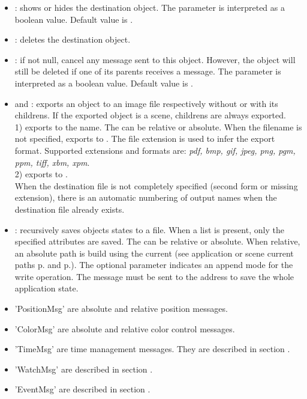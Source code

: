 \documentclass[a4paper,twoside]{report}
\begin{document}
\begin{itemize}
\item {}: shows or hides the destination object. The parameter is interpreted as a boolean value. Default value is . 
\item {}: deletes the destination object. 
\item {}: if not null, cancel any  message sent to this object. However, the object will still be deleted if one of its parents receives a  message. The parameter is interpreted as a boolean value. Default value is . 
\item {} and : exports an object to an image file respectively without or with its childrens. If the exported object is a scene, childrens are always exported.\\
1) exports to the  name. The  can be relative or absolute. When the filename is not specified, exports to . The file extension is used to infer the export format. Supported extensions and formats are: \emph{pdf, bmp, gif, jpeg, png, pgm, ppm, tiff, xbm, xpm}. \\
2) exports to .\\
When the destination file is not completely specified (second form or missing extension), there is an automatic numbering of output names when the destination file already exists.
\item {}: recursively saves objects states to a file. When a  list is present, only the specified attributes are saved. The  can be relative or absolute. When relative, an absolute path is build using the current  (see application or scene current paths  p.\pageref{applmgmt} and  p.\pageref{scene}). The optional \OSC{+} parameter indicates an append mode for the write operation. The message must be sent to the address  to save the whole application state.
\item 'PositionMsg' are absolute and relative position messages.
\item 'ColorMsg' are absolute and relative color control messages.
\item 'TimeMsg' are time management messages. They are described in section .
\item 'WatchMsg' are described in section .
\item 'EventMsg' are described in section .
\end{itemize}
\end{document}
